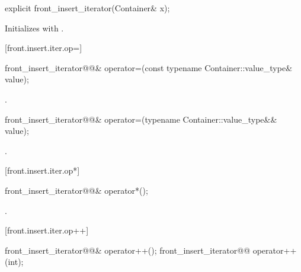 %

\begin{itemdecl}
explicit front_insert_iterator(Container& x);
\end{itemdecl}

\begin{itemdescr}
\pnum
\effects
Initializes
with .
\end{itemdescr}

[front.insert.iter.op=]{}

%
\begin{itemdecl}
front_insert_iterator@@&
  operator=(const typename Container::value_type& value);
\end{itemdecl}

\begin{itemdescr}
\pnum
\effects {}

\pnum
\returns
{}.
\end{itemdescr}

%
\begin{itemdecl}
front_insert_iterator@@&
  operator=(typename Container::value_type&& value);
\end{itemdecl}

\begin{itemdescr}
\pnum
\effects {}

\pnum
\returns
{}.
\end{itemdescr}

[front.insert.iter.op*]{}

%
\begin{itemdecl}
front_insert_iterator@@& operator*();
\end{itemdecl}

\begin{itemdescr}
\pnum
\returns
{}.
\end{itemdescr}

[front.insert.iter.op++]{}

%
\begin{itemdecl}
front_insert_iterator@@& operator++();
front_insert_iterator@@ operator++(int);
\end{itemdecl}

